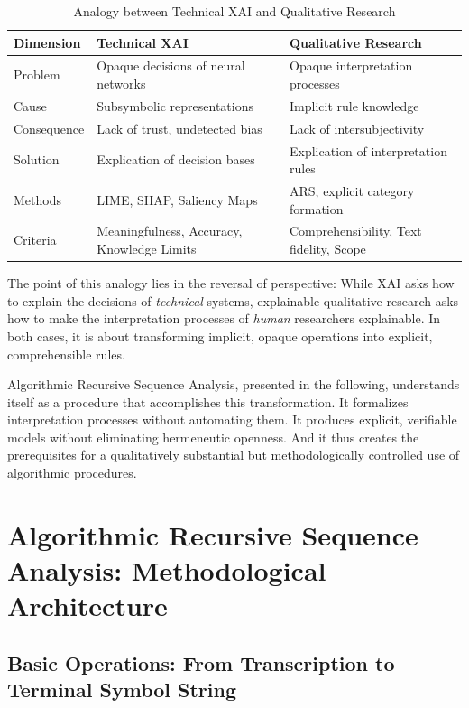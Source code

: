 \documentclass[
  12pt,
  a4paper,
  oneside,
  titlepage
]{article}
\begin{document}
\begin{table}[h]
\centering
\caption{Analogy between Technical XAI and Qualitative Research}
\label{tab:analogy}
\begin{tabular}{@{} p{2.5cm} p{5cm} p{5cm} @{}}
\toprule
\textbf{Dimension} & \textbf{Technical XAI} & \textbf{Qualitative Research} \\
\midrule
Problem & Opaque decisions of neural networks & Opaque interpretation processes \\
Cause & Subsymbolic representations & Implicit rule knowledge \\
Consequence & Lack of trust, undetected bias & Lack of intersubjectivity \\
Solution & Explication of decision bases & Explication of interpretation rules \\
Methods & LIME, SHAP, Saliency Maps & ARS, explicit category formation \\
Criteria & Meaningfulness, Accuracy, Knowledge Limits & Comprehensibility, Text fidelity, Scope \\
\bottomrule
\end{tabular}
\end{table}

The point of this analogy lies in the reversal of perspective: While XAI asks how to 
explain the decisions of \textit{technical} systems, explainable qualitative research 
asks how to make the interpretation processes of \textit{human} researchers explainable. 
In both cases, it is about transforming implicit, opaque operations into explicit, 
comprehensible rules.

Algorithmic Recursive Sequence Analysis, presented in the following, understands 
itself as a procedure that accomplishes this transformation. It formalizes 
interpretation processes without automating them. It produces explicit, verifiable 
models without eliminating hermeneutic openness. And it thus creates the prerequisites 
for a qualitatively substantial but methodologically controlled use of algorithmic 
procedures.

\section{Algorithmic Recursive Sequence Analysis: Methodological Architecture}

\subsection{Basic Operations: From Transcription to Terminal Symbol String}
\end{document}
